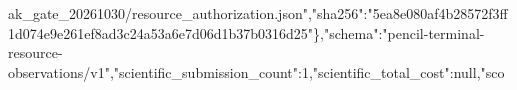 \documentclass[10pt]{article}
\begin{document}
ak{}\_\allowbreak{}g\allowbreak{}a\allowbreak{}t\allowbreak{}e\allowbreak{}\_\allowbreak{}2\allowbreak{}0\allowbreak{}2\allowbreak{}6\allowbreak{}1\allowbreak{}0\allowbreak{}3\allowbreak{}0\allowbreak{}/\allowbreak{}r\allowbreak{}e\allowbreak{}s\allowbreak{}o\allowbreak{}u\allowbreak{}r\allowbreak{}c\allowbreak{}e\allowbreak{}\_\allowbreak{}a\allowbreak{}u\allowbreak{}t\allowbreak{}h\allowbreak{}o\allowbreak{}r\allowbreak{}i\allowbreak{}z\allowbreak{}a\allowbreak{}t\allowbreak{}i\allowbreak{}o\allowbreak{}n\allowbreak{}.\allowbreak{}j\allowbreak{}s\allowbreak{}o\allowbreak{}n\allowbreak{}"\allowbreak{},\allowbreak{}"\allowbreak{}s\allowbreak{}h\allowbreak{}a\allowbreak{}2\allowbreak{}5\allowbreak{}6\allowbreak{}"\allowbreak{}:\allowbreak{}"\allowbreak{}5\allowbreak{}e\allowbreak{}a\allowbreak{}8\allowbreak{}e\allowbreak{}0\allowbreak{}8\allowbreak{}0\allowbreak{}a\allowbreak{}f\allowbreak{}4\allowbreak{}b\allowbreak{}2\allowbreak{}8\allowbreak{}5\allowbreak{}7\allowbreak{}2\allowbreak{}f\allowbreak{}3\allowbreak{}f\allowbreak{}f\allowbreak{}1\allowbreak{}d\allowbreak{}0\allowbreak{}7\allowbreak{}4\allowbreak{}e\allowbreak{}9\allowbreak{}e\allowbreak{}2\allowbreak{}6\allowbreak{}1\allowbreak{}e\allowbreak{}f\allowbreak{}8\allowbreak{}a\allowbreak{}d\allowbreak{}3\allowbreak{}c\allowbreak{}2\allowbreak{}4\allowbreak{}a\allowbreak{}5\allowbreak{}3\allowbreak{}a\allowbreak{}6\allowbreak{}e\allowbreak{}7\allowbreak{}d\allowbreak{}0\allowbreak{}6\allowbreak{}d\allowbreak{}1\allowbreak{}b\allowbreak{}3\allowbreak{}7\allowbreak{}b\allowbreak{}0\allowbreak{}3\allowbreak{}1\allowbreak{}6\allowbreak{}d\allowbreak{}2\allowbreak{}5\allowbreak{}"\allowbreak{}\}\allowbreak{},\allowbreak{}"\allowbreak{}s\allowbreak{}c\allowbreak{}h\allowbreak{}e\allowbreak{}m\allowbreak{}a\allowbreak{}"\allowbreak{}:\allowbreak{}"\allowbreak{}p\allowbreak{}e\allowbreak{}n\allowbreak{}c\allowbreak{}i\allowbreak{}l\allowbreak{}-\allowbreak{}t\allowbreak{}e\allowbreak{}r\allowbreak{}m\allowbreak{}i\allowbreak{}n\allowbreak{}a\allowbreak{}l\allowbreak{}-\allowbreak{}r\allowbreak{}e\allowbreak{}s\allowbreak{}o\allowbreak{}u\allowbreak{}r\allowbreak{}c\allowbreak{}e\allowbreak{}-\allowbreak{}o\allowbreak{}b\allowbreak{}s\allowbreak{}e\allowbreak{}r\allowbreak{}v\allowbreak{}a\allowbreak{}t\allowbreak{}i\allowbreak{}o\allowbreak{}n\allowbreak{}s\allowbreak{}/\allowbreak{}v\allowbreak{}1\allowbreak{}"\allowbreak{},\allowbreak{}"\allowbreak{}s\allowbreak{}c\allowbreak{}i\allowbreak{}e\allowbreak{}n\allowbreak{}t\allowbreak{}i\allowbreak{}f\allowbreak{}i\allowbreak{}c\allowbreak{}\_\allowbreak{}s\allowbreak{}u\allowbreak{}b\allowbreak{}m\allowbreak{}i\allowbreak{}s\allowbreak{}s\allowbreak{}i\allowbreak{}o\allowbreak{}n\allowbreak{}\_\allowbreak{}c\allowbreak{}o\allowbreak{}u\allowbreak{}n\allowbreak{}t\allowbreak{}"\allowbreak{}:\allowbreak{}1\allowbreak{},\allowbreak{}"\allowbreak{}s\allowbreak{}c\allowbreak{}i\allowbreak{}e\allowbreak{}n\allowbreak{}t\allowbreak{}i\allowbreak{}f\allowbreak{}i\allowbreak{}c\allowbreak{}\_\allowbreak{}t\allowbreak{}o\allowbreak{}t\allowbreak{}a\allowbreak{}l\allowbreak{}\_\allowbreak{}c\allowbreak{}o\allowbreak{}s\allowbreak{}t\allowbreak{}"\allowbreak{}:\allowbreak{}n\allowbreak{}u\allowbreak{}l\allowbreak{}l\allowbreak{},\allowbreak{}"\allowbreak{}s\allowbreak{}c\allowbreak{}o\allo
\end{document}

